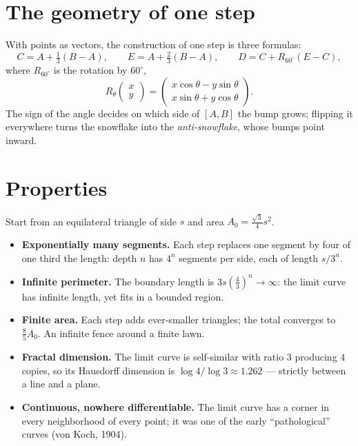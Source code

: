 \documentclass[11pt]{article}
\begin{document}
\section{The geometry of one step}

With points as vectors, the construction of one step is three formulas:
\begin{equation}
  C = A + \tfrac{1}{3}(B - A), \qquad
  E = A + \tfrac{2}{3}(B - A), \qquad
  D = C + R_{60^\circ}(E - C),
\end{equation}
where $R_{60^\circ}$ is the rotation by $60^\circ$,
\begin{equation}
  R_\theta \begin{pmatrix} x \\ y \end{pmatrix}
  = \begin{pmatrix}
      x \cos\theta - y \sin\theta \\
      x \sin\theta + y \cos\theta
    \end{pmatrix}.
\end{equation}
The sign of the angle decides on which side of $[A, B]$ the bump grows;
flipping it everywhere turns the snowflake into the \emph{anti-snowflake},
whose bumps point inward.

\section{Properties}

Start from an equilateral triangle of side $s$ and area
$A_0 = \frac{\sqrt{3}}{4} s^2$.
\begin{itemize}
  \item \textbf{Exponentially many segments.} Each step replaces one segment
    by four of one third the length: depth $n$ has $4^n$ segments per side,
    each of length $s / 3^n$.
  \item \textbf{Infinite perimeter.} The boundary length is
    $3 s \left(\tfrac{4}{3}\right)^n \to \infty$: the limit curve has
    infinite length, yet fits in a bounded region.
  \item \textbf{Finite area.} Each step adds ever-smaller triangles; the
    total converges to $\tfrac{8}{5} A_0$. An infinite fence around a finite
    lawn.
  \item \textbf{Fractal dimension.} The limit curve is self-similar with
    ratio $3$ producing $4$ copies, so its Hausdorff dimension is
    $\log 4 / \log 3 \approx 1.262$ --- strictly between a line and a plane.
  \item \textbf{Continuous, nowhere differentiable.} The limit curve has a
    corner in every neighborhood of every point; it was one of the early
    ``pathological'' curves (von Koch, 1904).
\end{itemize}
\end{document}

